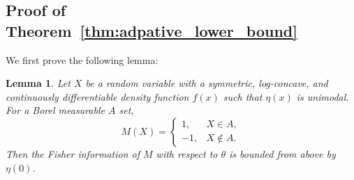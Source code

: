\documentclass[letterpaper, 11pt]{IEEEtran}      %
\newtheorem{lem}[thm]{\bf {Lemma}}
\begin{document}
\subsection*{Proof of Theorem~\ref{thm:adpative_lower_bound}}

We first prove the following lemma:
\begin{lem} \label{lem:fisher_bound}
Let $X$ be a random variable with a symmetric, log-concave, and continuously differentiable density function $f(x)$ such that $\eta(x)$ is unimodal. For a Borel measurable $A$ set, 
\[
M(X) = \begin{cases} 1,& X \in A, \\
-1, & X \notin A.
\end{cases}
\]
Then the Fisher information of $M$ with respect to $\theta$ is bounded from above by $\eta(0)$.
\end{lem}
\end{document}
